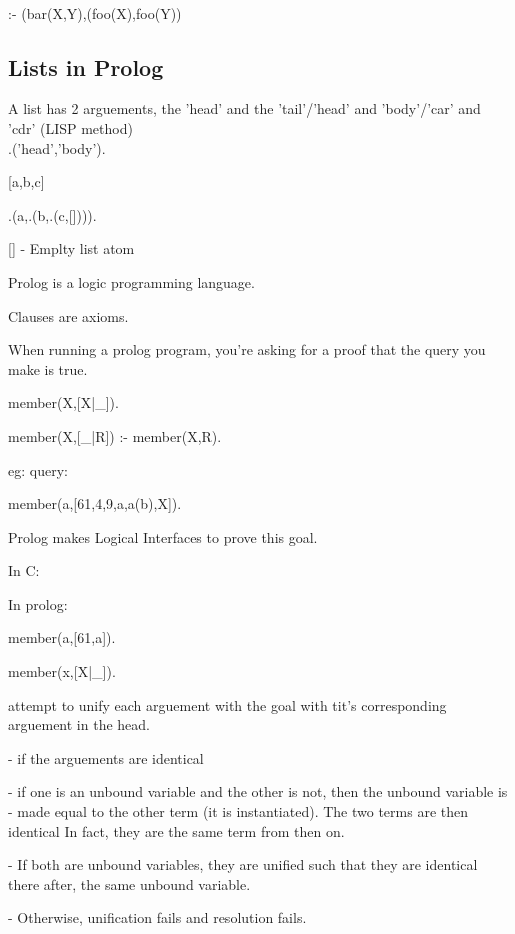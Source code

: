 \documentclass[a4paper,12pt]{article}
\begin{document}
\\

:- (bar(X,Y),\left(foo(X),foo(Y)\right)

\subsection{Lists in Prolog}

A list has 2 arguements, the 'head' and the 'tail'/'head' and 'body'/'car' and 'cdr' (LISP method) \\

.('head','body').

[a,b,c]

.(a,.(b,.(c,[]))).

[] - Emplty list atom

Prolog is a logic programming language.

Clauses are axioms.

When running a prolog program, you're asking for a proof that the query you make is true.


member(X,[X|_]).

member(X,[_|R]) :- member(X,R).


eg: query:


member(a,[61,4,9,a,a(b),X]).


Prolog makes Logical Interfaces to prove this goal.


In C:




In prolog:


member(a,[61,a]).
   
member(x,[X|_]).


attempt to unify each arguement with the goal with tit's corresponding arguement in the head.

	- if the arguements are identical
	
	- if one is an unbound variable and the other is not, then the unbound variable is 
	- made equal to the other term (it is instantiated). The two terms are then identical
	  In fact, they are the same term from then on.

	- If both are unbound variables, they are unified such that they are identical there after,
	  the same unbound variable.

	- Otherwise, unification fails and resolution fails.
\end{document}
